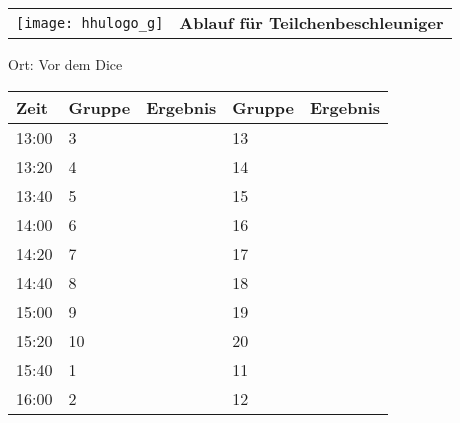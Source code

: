 \documentclass[a4paper,10pt]{article}
\def\spielc{Teilchenbeschleuniger}
\def\raumc{Vor dem Dice}
\begin{document}
  \begin{tabularx}{\textwidth}{lc}
    \texttt{[image: hhulogo\_g]}
  & {\Huge \textbf{Ablauf für \spielc}}
  \end{tabularx}
  \LARGE
  \begin{center}
    \vspace{1cm} 
    Ort: \raumc
  \end{center}
    \vspace{2cm} 
    \begin{tabularx}{\textwidth}{X||X|X||X|X}
	\textbf{Zeit} &\textbf{Gruppe} & \textbf{Ergebnis} &\textbf{Gruppe} & \textbf{Ergebnis}  	\\ \hline \hline
	13:00 &	3	&	&13	&	\\ \hline
	13:20 &	4	&	&14	&	\\ \hline
	13:40 &	5	&	&15	&	\\ \hline

	14:00 &	6	&	&16	&	\\ \hline
	14:20 &	7	&	&17	&	\\ \hline
	14:40 &	8	&	&18	&	\\ \hline

	15:00 &	9	&	&19	&	\\ \hline
	15:20 &	10	&	&20	&	\\ \hline
	15:40 &	1	&	&11	&	\\ \hline

	16:00 &	2	&	&12	&	\\ \hline
      
    \end{tabularx}
   
   \newpage
\end{document}
